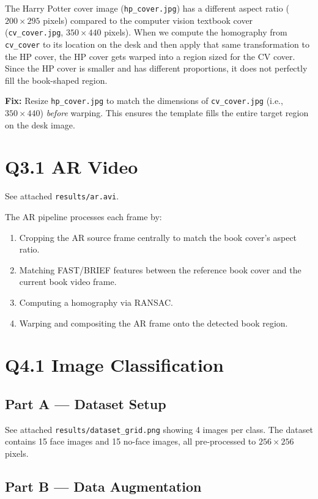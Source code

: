 \documentclass[12pt]{article}
\begin{document}
The Harry Potter cover image (\texttt{hp\_cover.jpg}) has a different aspect ratio ($200 \times 295$ pixels) compared to the computer vision textbook cover (\texttt{cv\_cover.jpg}, $350 \times 440$ pixels). When we compute the homography from \texttt{cv\_cover} to its location on the desk and then apply that same transformation to the HP cover, the HP cover gets warped into a region sized for the CV cover. Since the HP cover is smaller and has different proportions, it does not perfectly fill the book-shaped region.

\textbf{Fix:} Resize \texttt{hp\_cover.jpg} to match the dimensions of \texttt{cv\_cover.jpg} (i.e., $350 \times 440$) \emph{before} warping. This ensures the template fills the entire target region on the desk image.

\section*{Q3.1 AR Video}

See attached \texttt{results/ar.avi}.

The AR pipeline processes each frame by:
\begin{enumerate}
\item Cropping the AR source frame centrally to match the book cover's aspect ratio.
\item Matching FAST/BRIEF features between the reference book cover and the current book video frame.
\item Computing a homography via RANSAC.
\item Warping and compositing the AR frame onto the detected book region.
\end{enumerate}

\newpage
\section*{Q4.1 Image Classification}

\subsection*{Part A --- Dataset Setup}

See attached \texttt{results/dataset\_grid.png} showing 4 images per class. The dataset contains 15 face images and 15 no-face images, all pre-processed to $256 \times 256$ pixels.

\subsection*{Part B --- Data Augmentation}
\end{document}
